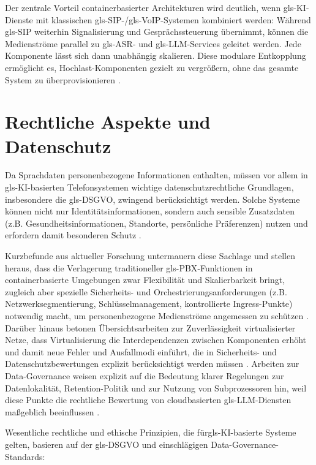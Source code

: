 Der zentrale Vorteil containerbasierter Architekturen wird deutlich, wenn \gls{gls-KI}-Dienste mit klassischen \gls{gls-SIP}-/\gls{gls-VoIP}-Systemen kombiniert werden: Während \gls{gls-SIP} weiterhin Signalisierung und Gesprächssteuerung übernimmt, können die Medienströme parallel zu \gls{gls-ASR}- und \gls{gls-LLM}-Services geleitet werden. Jede Komponente lässt sich dann unabhängig skalieren. Diese modulare Entkopplung ermöglicht es, Hochlast-Komponenten gezielt zu vergrö\ss ern, ohne das gesamte System zu überprovisionieren \parencite{Antonova2025,ReliabilityVirtualizedNetworks}.

\section{Rechtliche Aspekte und Datenschutz}

Da Sprachdaten personenbezogene Informationen enthalten, müssen vor allem in \gls{gls-KI}-basierten Telefonsystemen wichtige datenschutzrechtliche Grundlagen, insbesondere die \gls{gls-DSGVO}, zwingend berücksichtigt werden. Solche Systeme können nicht nur Identitätsinformationen, sondern auch sensible Zusatzdaten (z.B. Gesundheitsinformationen, Standorte, persönliche Präferenzen) nutzen und erfordern damit besonderen Schutz \parencite{Data2025_AIDataQuality}.

Kurzbefunde aus aktueller Forschung untermauern diese Sachlage und stellen heraus, dass die Verlagerung traditioneller \gls{gls-PBX}-Funktionen in containerbasierte Umgebungen zwar Flexibilität und Skalierbarkeit bringt, zugleich aber spezielle Sicherheits- und Orchestrierungsanforderungen (z.B. Netzwerksegmentierung, Schlüsselmanagement, kontrollierte Ingress-Punkte) notwendig macht, um personenbezogene Medienströme angemessen zu schützen \parencite{Antonova2025}. Darüber hinaus betonen Übersichtsarbeiten zur Zuverlässigkeit virtualisierter Netze, dass Virtualisierung die Interdependenzen zwischen Komponenten erhöht und damit neue Fehler und
Ausfallmodi einführt, die in Sicherheits- und
Datenschutzbewertungen explizit berücksichtigt werden müssen \parencite{ReliabilityVirtualizedNetworks}. Arbeiten zur Data-Governance weisen explizit auf die Bedeutung klarer Regelungen zur Datenlokalität, Retention-Politik und zur Nutzung von Subprozessoren hin, weil diese Punkte die rechtliche Bewertung von cloudbasierten \gls{gls-LLM}-Diensten ma\ss geblich beeinflussen \parencite{Data2025_AIDataQuality}.

Wesentliche rechtliche und ethische Prinzipien, die für\gls{gls-KI}-basierte Systeme gelten, basieren auf der \gls{gls-DSGVO} und
einschlägigen Data-Governance-Standards:

